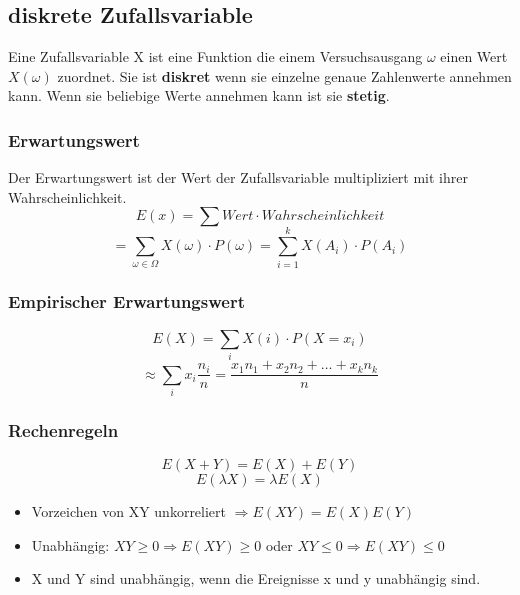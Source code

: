 \documentclass[margin=normal]{tex/hsrzf}
\begin{document}
\subsection{diskrete Zufallsvariable}
\begin{multicols}{2}

    Eine Zufallsvariable X ist eine Funktion die einem
    Versuchsausgang $\omega$ einen Wert $X(\omega)$ zuordnet.
    Sie ist \textbf{diskret} wenn sie einzelne genaue Zahlenwerte annehmen kann.
    Wenn sie beliebige Werte annehmen kann ist sie \textbf{stetig}.

    \subsubsection*{Erwartungswert}
    Der Erwartungswert ist der Wert der Zufallsvariable multipliziert mit ihrer Wahrscheinlichkeit.
    $$E(x) = \sum Wert \cdot Wahrscheinlichkeit$$
    $$ =\sum _{\omega \in \Omega} X(\omega) \cdot P({\omega}) = \sum _{i=1} ^{k} X(A_i) \cdot P(A_i)$$
    \subsubsection*{Empirischer Erwartungswert}

    $$ E(X) = \sum _i X(i) \cdot P(X=x_i)$$
    $$\approx \sum _i x_i \frac{n_i}{n} = \frac{x_1n_1 + x_2n_2 + \dots + x_kn_k}{n}$$

    \subsubsection*{Rechenregeln}
    $$E(X+Y) = E(X) + E(Y)$$
    $$E(\lambda X) = \lambda E(X)$$

    \begin{itemize}
        \item Vorzeichen von XY unkorreliert \newline $\Rightarrow E(XY) = E(X)E(Y)$
        \item Unabhängig: $XY \geq 0 \Rightarrow E(XY) \geq 0$ \newline oder $XY\leq 0 \Rightarrow E(XY) \leq 0$
        \item X und Y sind unabhängig, wenn die Ereignisse x und y unabhängig sind.
    \end{itemize}
\end{multicols}
\end{document}

